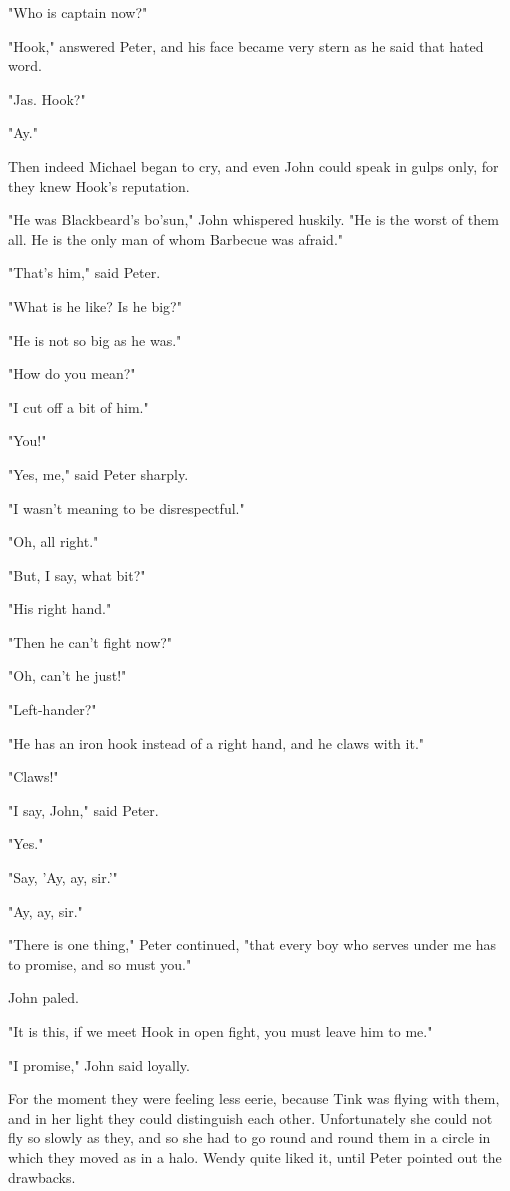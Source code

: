 "Who is captain now?"


"Hook," answered Peter, and his face became very stern as he said that
hated word.


"Jas. Hook?"


"Ay."


Then indeed Michael began to cry, and even John could speak in gulps only,
for they knew Hook's reputation.


"He was Blackbeard's bo'sun," John whispered huskily. "He is the worst of
them all. He is the only man of whom Barbecue was afraid."


"That's him," said Peter.


"What is he like? Is he big?"


"He is not so big as he was."


"How do you mean?"


"I cut off a bit of him."


"You!"


"Yes, me," said Peter sharply.


"I wasn't meaning to be disrespectful."


"Oh, all right."


"But, I say, what bit?"


"His right hand."


"Then he can't fight now?"


"Oh, can't he just!"


"Left-hander?"


"He has an iron hook instead of a right hand, and he claws with it."


"Claws!"


"I say, John," said Peter.


"Yes."


"Say, 'Ay, ay, sir.'"


"Ay, ay, sir."


"There is one thing," Peter continued, "that every boy who serves under me
has to promise, and so must you."


John paled.


"It is this, if we meet Hook in open fight, you must leave him to me."


"I promise," John said loyally.


For the moment they were feeling less eerie, because Tink was flying with
them, and in her light they could distinguish each other. Unfortunately
she could not fly so slowly as they, and so she had to go round and round
them in a circle in which they moved as in a halo. Wendy quite liked it,
until Peter pointed out the drawbacks.


